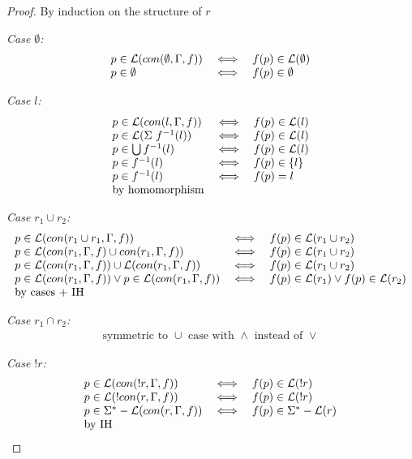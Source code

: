 \documentclass[twocolumn, openany]{sig-alternate-10pt}
\begin{document}
\begin{proof}
By induction on the structure of $r$

\emph{Case $\emptyset$:}
  \[ \begin{array}{lll}
    p \in \mathcal{L}(con(\emptyset,\Gamma,f)) &\iff& f(p) \in \mathcal{L}(\emptyset) \\
    p \in \emptyset &\iff& f(p) \in \emptyset \\
  \end{array} \]

\emph{Case $l$:}
  \[ \begin{array}{lll}
    p \in \mathcal{L}(con(l,\Gamma,f)) &\iff& f(p) \in \mathcal{L}(l) \\
    p \in \mathcal{L}(\Sigma ~ f^{-1}(l)) &\iff& f(p) \in \mathcal{L}(l) \\
    p \in \bigcup f^{-1}(l) &\iff& f(p) \in \mathcal{L}(l) \\
    p \in f^{-1}(l) &\iff& f(p) \in \{ l \} \\
    p \in f^{-1}(l) &\iff& f(p) = l \\
    \text{by homomorphism} & & \\
  \end{array} \]

\emph{Case $r_1 \cup r_2$:}
  \[ \begin{array}{lll}
    p \in \mathcal{L}(con(r_1 \cup r_1,\Gamma,f)) &\iff& f(p) \in \mathcal{L}(r_1 \cup r_2) \\
    p \in \mathcal{L}(con(r_1,\Gamma,f) \cup con(r_1,\Gamma,f)) &\iff& f(p) \in \mathcal{L}(r_1 \cup r_2) \\
    p \in \mathcal{L}(con(r_1,\Gamma,f)) \cup \mathcal{L}(con(r_1,\Gamma,f)) &\iff& f(p) \in \mathcal{L}(r_1 \cup r_2) \\
    p \in \mathcal{L}(con(r_1,\Gamma,f)) \vee p \in \mathcal{L}(con(r_1,\Gamma,f)) 
       &\iff& 
       f(p) \in \mathcal{L}(r_1) \vee f(p) \in \mathcal{L}(r_2) \\
    \text{by cases + IH} & & \\
  \end{array} \]

\emph{Case $r_1 \cap r_2$:} 
  \[ \begin{array}{c}
    \text{symmetric to } \cup \text{ case with } \wedge \text{ instead of } \vee
  \end{array} \]

\emph{Case $!r$:}
  \[ \begin{array}{lll}
    p \in \mathcal{L}(con(!r,\Gamma,f)) &\iff& f(p) \in \mathcal{L}(!r) \\
    p \in \mathcal{L}(!con(r,\Gamma,f)) &\iff& f(p) \in \mathcal{L}(!r) \\
    p \in \Sigma^* - \mathcal{L}(con(r,\Gamma,f)) &\iff& f(p) \in \Sigma^* - \mathcal{L}(r) \\
    \text{by IH} & & \\
  \end{array} \]


\end{proof}
\end{document}

